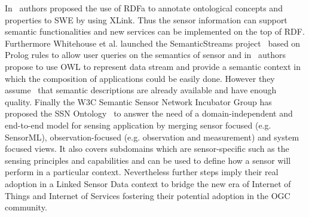 In~\cite{Sheth:2008:SSW:1444383.1444435} authors proposed the use of RDFa to annotate ontological concepts and 
properties to SWE by using XLink. Thus the sensor information can support 
semantic functionalities and new services can be implemented on the top of RDF. 
Furthermore Whitehouse et al. launched the SemanticStreams project~\cite{Whitehouse:2006:SSF:2180141.2180148} based on 
Prolog rules to allow user queries on the semantics of sensor and in~\cite{Bouillet:2007:SMU:1769087.1769099} 
authors propose to use OWL to represent data stream and provide a semantic 
context in which the composition of applications could be easily done. However 
they assume~\cite{deri2010} that semantic descriptions are already available and have 
enough quality. Finally the W3C Semantic Sensor Network Incubator Group has 
proposed the SSN Ontology~\cite{Compton:2012:OPS:2400766.2401456} to answer the need of a domain-independent and 
end-to-end model for sensing application by merging sensor focused (e.g. SensorML), observation-focused (e.g. observation and measurement) and system 
focused views. It also covers subdomains which are sensor-specific such as the 
sensing principles and capabilities and can be used to define how a sensor will 
perform in a particular context. Nevertheless further steps imply their real 
adoption in a Linked Sensor Data context to bridge the new era of Internet of 
Things and Internet of Services fostering their potential adoption in the OGC 
community.


